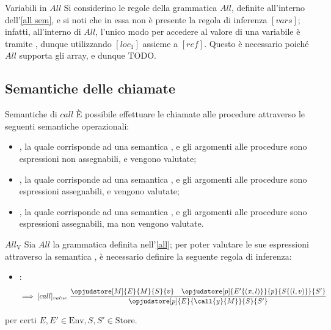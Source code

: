 \documentclass[a4paper, 12pt]{report}
\begin{document}
    \begin{framedobs}{Variabili in $All$}
        Si considerino le regole della grammatica $All$, definite all'interno dell'\cref{all sem}, e si noti che in essa non è presente la regola di inferenza $[vars]$; infatti, all'interno di $All$, l'unico modo per accedere al valore di una variabile è tramite , dunque utilizzando $[loc_1]$ assieme a $[ref]$. Questo è necessario poiché $All$ supporta gli array, e dunque TODO.
    \end{framedobs}

    \subsection{Semantiche delle chiamate}

    \begin{frameddefn}{Semantiche di $call$}
        È possibile effettuare le chiamate alle procedure attraverso le seguenti semantiche operazionali:

        \begin{itemize}
            \item {}, la quale corrisponde ad una semantica , e gli argomenti alle procedure sono espressioni non assegnabili, e vengono valutate;
            \item {}, la quale corrisponde ad una semantica , e gli argomenti alle procedure sono espressioni assegnabili, e vengono valutate;
            \item {}, la quale corrisponde ad una semantica , e gli argomenti alle procedure sono espressioni assegnabili, ma non vengono valutate.
        \end{itemize}
    \end{frameddefn}

    \begin{framedprop}[label={all v}]{$All_\mathrm{V}$}
        Sia $All$ la grammatica definita nell'\cref{all}; per poter valutare le sue espressioni attraverso la semantica , è necessario definire la seguente regola di inferenza:

        \begin{itemize}
            \item {}:  $$\implies [call]_{value} \ \dfrac{\opjudstore[M]{E}{M}{S}{v} \quad \opjudstore[p]{E'\{(x,l)\}}{p}{S\{(l,v)\}}{S'}}{\opjudstore[p]{E}{\call{y}{M}}{S}{S'}}$$
        \end{itemize}

        per certi $E, E' \in \mathrm{Env}, S,S' \in \mathrm{Store}$.
    \end{framedprop}
\end{document}
